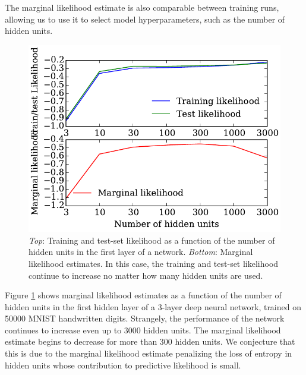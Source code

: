 \documentclass[]{article}
\begin{document}

The marginal likelihood estimate is also comparable between training runs, allowing us to use it to select model hyperparameters, such as the number of hidden units.

\begin{figure}[h!]
\begin{center}
\includegraphics[width=\columnwidth]{../experiments/2015_03_03_vary_width/6_hidden_units/vary_widths.pdf}
\vskip -0.1in
\caption{\emph{Top}: Training and test-set likelihood as a function of the number of hidden units in the first layer of a network.
\emph{Bottom}: Marginal likelihood estimates.
In this case, the training and test-set likelihood continue to increase no matter how many hidden units are used.}
\label{fig:num hiddens}
\end{center}
\end{figure}

Figure \ref{fig:num hiddens} shows marginal likelihood estimates as a function of the number of hidden units in the first hidden layer of a 3-layer deep neural network, trained on 50000 MNIST handwritten digits.
Strangely, the performance of the network continues to increase even up to 3000 hidden units.
The marginal likelihood estimate begins to decrease for more than 300 hidden units.
We conjecture that this is due to the marginal likelihood estimate penalizing the loss of entropy in hidden units whose contribution to predictive likelihood is small.
\end{document}
